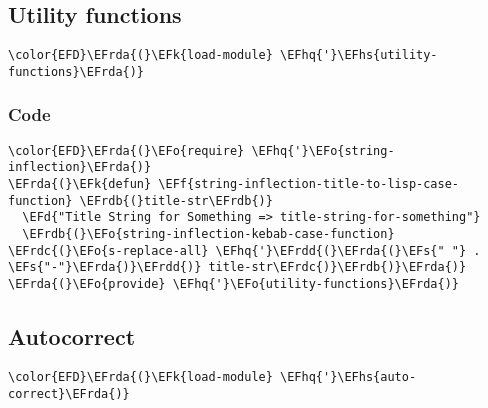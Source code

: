 \documentclass[a4wide,10pt]{article}
\newcommand{\EFs}[1]{\textcolor{EFs}{#1}} %
\newcommand{\EFd}[1]{\textcolor{EFd}{#1}} %
\newcommand{\EFk}[1]{\textcolor{EFk}{#1}} %
\newcommand{\EFf}[1]{\textcolor{EFf}{#1}} %
\newcommand{\EFo}[1]{\textcolor{EFo}{#1}} %
\newcommand{\EFhq}[1]{\textcolor{EFhq}{#1}} %
\newcommand{\EFhs}[1]{\textcolor{EFhs}{#1}} %
\newcommand{\EFrda}[1]{\textcolor{EFrda}{#1}} %
\newcommand{\EFrdb}[1]{\textcolor{EFrdb}{#1}} %
\newcommand{\EFrdc}[1]{\textcolor{EFrdc}{#1}} %
\newcommand{\EFrdd}[1]{\textcolor{EFrdd}{#1}} %
\begin{document}
\subsection{Utility functions}
\label{sec:org7406286}
\begin{Code}
\begin{Verbatim}
\color{EFD}\EFrda{(}\EFk{load-module} \EFhq{'}\EFhs{utility-functions}\EFrda{)}
\end{Verbatim}
\end{Code}
\subsubsection{Code}
\label{sec:org35430c6}
\begin{Code}
\begin{Verbatim}
\color{EFD}\EFrda{(}\EFo{require} \EFhq{'}\EFo{string-inflection}\EFrda{)}
\EFrda{(}\EFk{defun} \EFf{string-inflection-title-to-lisp-case-function} \EFrdb{(}title-str\EFrdb{)}
  \EFd{"Title String for Something => title-string-for-something"}
  \EFrdb{(}\EFo{string-inflection-kebab-case-function} \EFrdc{(}\EFo{s-replace-all} \EFhq{'}\EFrdd{(}\EFrda{(}\EFs{" "} . \EFs{"-"}\EFrda{)}\EFrdd{)} title-str\EFrdc{)}\EFrdb{)}\EFrda{)}
\EFrda{(}\EFo{provide} \EFhq{'}\EFo{utility-functions}\EFrda{)}
\end{Verbatim}
\end{Code}
\subsection{Autocorrect}
\label{sec:org194b9a9}
\begin{Code}
\begin{Verbatim}
\color{EFD}\EFrda{(}\EFk{load-module} \EFhq{'}\EFhs{auto-correct}\EFrda{)}
\end{Verbatim}
\end{Code}
\end{document}
